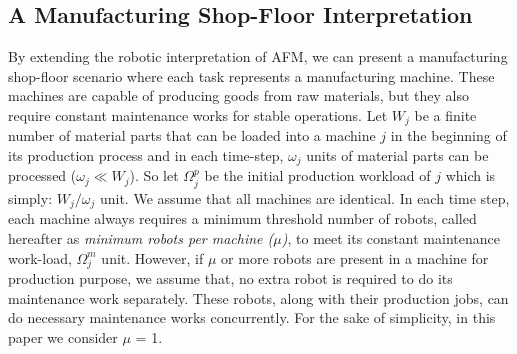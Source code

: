\documentclass{llncs}
\begin{document}
\subsection{A Manufacturing Shop-Floor Interpretation}
\label{sec:afm:vms}
By extending the robotic interpretation of AFM, we can present a manufacturing shop-floor scenario where each task represents a manufacturing machine. These machines are capable of producing goods from raw materials, but they also require constant maintenance works for stable operations. Let $W_{j}$ be a finite number of material parts that can be loaded into a machine $j$ in the beginning of its production process and in each time-step, $\omega_{j}$ units of material parts can be processed  ($\omega_{j} \ll W_{j} $). So let $\Omega_{j}^{p}$ be the initial production workload of $j$ which is simply: $W_{j} / \omega_{j}$ unit. We assume that all machines are identical. In each time step, each machine always requires a minimum threshold number of robots, called hereafter as {\em minimum robots per machine ($\mu$)}, to meet its constant maintenance work-load, $\Omega_{j}^{m}$ unit. However, if $\mu$ or more robots are present in a machine for production purpose, we assume that, no extra robot is required to do its maintenance work separately. These robots, along with their production jobs, can do necessary maintenance works concurrently. For the sake of simplicity, in this paper we consider $\mu$ = 1.
\end{document}
